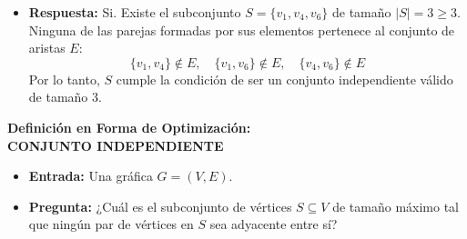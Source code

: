 \begin{enumerate}
\begin{itemize}
    \item \textbf{Respuesta:} Si.
    Existe el subconjunto $S = \{v_1, v_4, v_6\}$ de tamaño $|S| = 3 \ge 3$. Ninguna de las parejas formadas por sus elementos pertenece al conjunto de aristas $E$:
    \[
    \{v_1, v_4\} \notin E, \quad \{v_1, v_6\} \notin E, \quad \{v_4, v_6\} \notin E
    \]
    Por lo tanto, $S$ cumple la condición de ser un conjunto independiente válido de tamaño 3.
\end{itemize}

    
    \textbf{Definición en Forma de Optimización:}\\
    \textbf{CONJUNTO INDEPENDIENTE}
    \begin{itemize}
    \item \textbf{Entrada:} Una gráfica $G = (V, E)$.
    \item \textbf{Pregunta:} ¿Cuál es el subconjunto de vértices $S \subseteq V$ de tamaño máximo tal que ningún par de vértices en $S$ sea adyacente entre sí?
    \end{itemize}


\end{enumerate}




